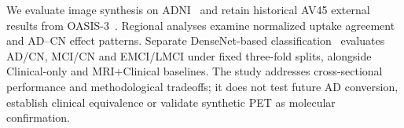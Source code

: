 We evaluate image synthesis on ADNI~\cite{weiner2010alzheimer} and retain historical AV45 external results from OASIS-3~\cite{lamontagne2019oasis}. Regional analyses examine normalized uptake agreement and AD--CN effect patterns. Separate DenseNet-based classification~\cite{huang2017densely} evaluates AD/CN, MCI/CN and EMCI/LMCI under fixed three-fold splits, alongside Clinical-only and MRI+Clinical baselines. The study addresses cross-sectional performance and methodological tradeoffs; it does not test future AD conversion, establish clinical equivalence or validate synthetic PET as molecular confirmation.
